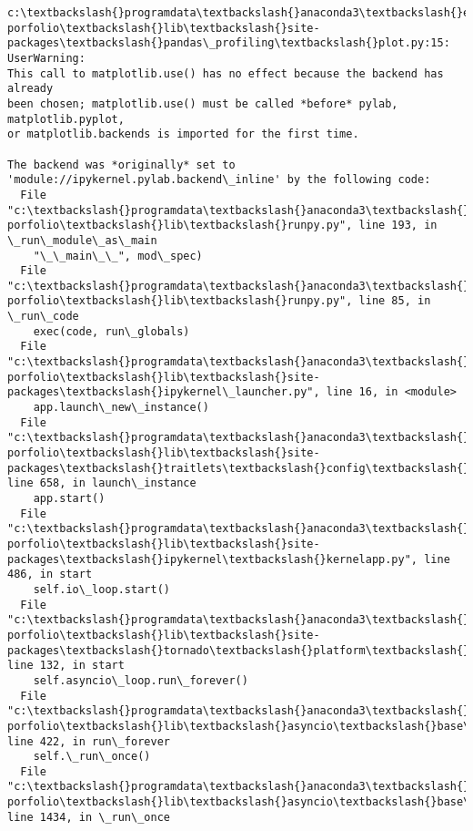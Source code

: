 \documentclass[11pt]{article}
\begin{document}
    \begin{Verbatim}[commandchars=\\\{\}]
c:\textbackslash{}programdata\textbackslash{}anaconda3\textbackslash{}envs\textbackslash{}ml-porfolio\textbackslash{}lib\textbackslash{}site-packages\textbackslash{}pandas\_profiling\textbackslash{}plot.py:15: UserWarning: 
This call to matplotlib.use() has no effect because the backend has already
been chosen; matplotlib.use() must be called *before* pylab, matplotlib.pyplot,
or matplotlib.backends is imported for the first time.

The backend was *originally* set to 'module://ipykernel.pylab.backend\_inline' by the following code:
  File "c:\textbackslash{}programdata\textbackslash{}anaconda3\textbackslash{}envs\textbackslash{}ml-porfolio\textbackslash{}lib\textbackslash{}runpy.py", line 193, in \_run\_module\_as\_main
    "\_\_main\_\_", mod\_spec)
  File "c:\textbackslash{}programdata\textbackslash{}anaconda3\textbackslash{}envs\textbackslash{}ml-porfolio\textbackslash{}lib\textbackslash{}runpy.py", line 85, in \_run\_code
    exec(code, run\_globals)
  File "c:\textbackslash{}programdata\textbackslash{}anaconda3\textbackslash{}envs\textbackslash{}ml-porfolio\textbackslash{}lib\textbackslash{}site-packages\textbackslash{}ipykernel\_launcher.py", line 16, in <module>
    app.launch\_new\_instance()
  File "c:\textbackslash{}programdata\textbackslash{}anaconda3\textbackslash{}envs\textbackslash{}ml-porfolio\textbackslash{}lib\textbackslash{}site-packages\textbackslash{}traitlets\textbackslash{}config\textbackslash{}application.py", line 658, in launch\_instance
    app.start()
  File "c:\textbackslash{}programdata\textbackslash{}anaconda3\textbackslash{}envs\textbackslash{}ml-porfolio\textbackslash{}lib\textbackslash{}site-packages\textbackslash{}ipykernel\textbackslash{}kernelapp.py", line 486, in start
    self.io\_loop.start()
  File "c:\textbackslash{}programdata\textbackslash{}anaconda3\textbackslash{}envs\textbackslash{}ml-porfolio\textbackslash{}lib\textbackslash{}site-packages\textbackslash{}tornado\textbackslash{}platform\textbackslash{}asyncio.py", line 132, in start
    self.asyncio\_loop.run\_forever()
  File "c:\textbackslash{}programdata\textbackslash{}anaconda3\textbackslash{}envs\textbackslash{}ml-porfolio\textbackslash{}lib\textbackslash{}asyncio\textbackslash{}base\_events.py", line 422, in run\_forever
    self.\_run\_once()
  File "c:\textbackslash{}programdata\textbackslash{}anaconda3\textbackslash{}envs\textbackslash{}ml-porfolio\textbackslash{}lib\textbackslash{}asyncio\textbackslash{}base\_events.py", line 1434, in \_run\_once

\end{Verbatim}
\end{document}
